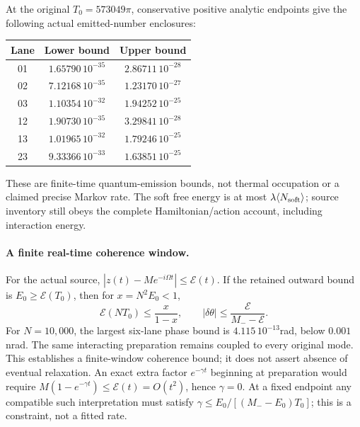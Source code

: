 At the original \(T_0=573049\pi\), conservative positive analytic
endpoints give the following actual emitted-number enclosures:
\begin{center}\small
\begin{tabular}{c|cc}
Lane&Lower bound&Upper bound\\\hline
01&\(1.65790\,10^{-35}\)&\(2.86711\,10^{-28}\)\\
02&\(7.12168\,10^{-35}\)&\(1.23170\,10^{-27}\)\\
03&\(1.10354\,10^{-32}\)&\(1.94252\,10^{-25}\)\\
12&\(1.90730\,10^{-35}\)&\(3.29841\,10^{-28}\)\\
13&\(1.01965\,10^{-32}\)&\(1.79246\,10^{-25}\)\\
23&\(9.33366\,10^{-33}\)&\(1.63851\,10^{-25}\)
\end{tabular}\end{center}
These are finite-time quantum-emission bounds, not thermal occupation or a
claimed precise Markov rate. The soft free energy is at most
\(\lambda\langle N_{\rm soft}\rangle\); source inventory still obeys
the complete Hamiltonian/action account, including interaction energy.

\paragraph{A finite real-time coherence window.}
For the actual source,
\(|z(t)-M e^{-i\Omega t}|\le\mathcal E(t)\).
If the retained outward bound is \(E_0\ge\mathcal E(T_0)\), then for
\(x=N^2E_0<1\),
\begin{equation}
 \mathcal E(NT_0)\le\frac{x}{1-x},\qquad
 |\delta\theta|\le\frac{\mathcal E}{M_- -\mathcal E}.
\end{equation}
For \(N=10{,}000\), the largest six-lane phase bound is
\(4.115\,10^{-13}\)rad, below \(0.001\)nrad. The same interacting
preparation remains coupled to every original mode. This establishes a
finite-window coherence bound; it does not assert absence of eventual
relaxation. An exact extra factor \(e^{-\gamma t}\) beginning at
preparation would require
\(M(1-e^{-\gamma t})\le\mathcal E(t)=O(t^2)\), hence \(\gamma=0\).
At a fixed endpoint any compatible such interpretation must satisfy
\(\gamma\le E_0/[(M_--E_0)T_0]\); this is a constraint, not a fitted rate.

